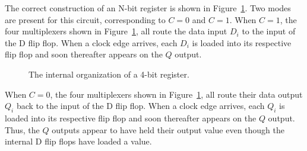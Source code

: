 The correct construction of an N-bit register is shown in 
Figure~\ref{fig:reg}.   Two modes are present for this circuit, 
corresponding to $C=0$ and $C=1$.  When $C=1$, the four multiplexers 
shown in Figure~\ref{fig:reg}, all route the data input $D_i$ 
to the input of the D flip flop.  When a clock edge arrives,
each $D_i$ is loaded into its respective flip flop and
soon thereafter appears on the $Q$ output. 

\begin{figure}[ht]
\caption{The internal organization of a 4-bit register.}
\label{fig:reg}
\end{figure}

When $C=0$, the four multiplexers shown in Figure~\ref{fig:reg}, 
all route their data output $Q_i$ back to the input of the 
D flip flop.  When a clock edge arrives, each $Q_i$ is  
loaded into its respective flip flop and soon thereafter appears 
on the $Q$ output. Thus, the $Q$ outputs appear to have
held their output value even though the internal 
D flip flops have loaded a value.




